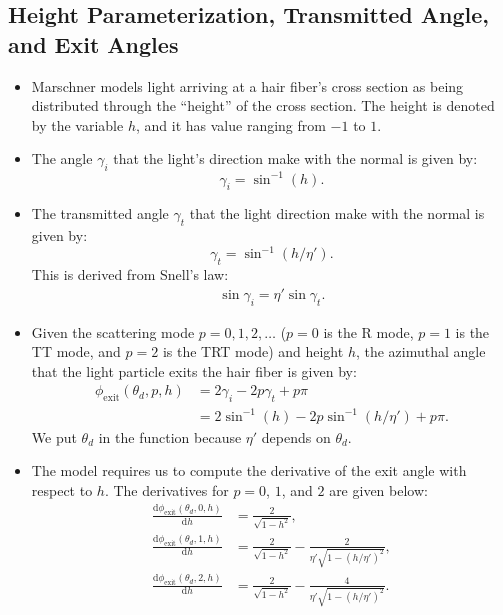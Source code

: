 \documentclass[10pt]{article}
\newcommand{\dee}{\mathrm{d}}
\newcommand{\exit}{\mathrm{exit}}
\begin{document}
  \subsection{Height Parameterization, Transmitted Angle, 
    and Exit Angles}
    
  \begin{itemize}
    \item Marschner models light arriving at a hair fiber's cross
      section as being distributed through the ``height'' of the
      cross section. The height is denoted by the variable $h$,
      and it has value ranging from $-1$ to $1$.
      
    \item The angle $\gamma_i$ that the light's direction make
      with the normal is given by:
      $$\gamma_i = \sin^{-1}(h).$$
      
    \item The transmitted angle $\gamma_t$ that the light direction
      make with the normal is given by:
      $$\gamma_t = \sin^{-1}(h / \eta').$$
      This is derived from Snell's law:
      \begin{align*}
        \sin \gamma_i = \eta' \sin \gamma_t.
      \end{align*}
      
    \item Given the scattering mode $p = 0, 1, 2, \ldots$
      ($p = 0$ is the R mode, $p = 1$ is the TT mode,
      and $p = 2$ is the TRT mode) and height $h$, 
      the azimuthal angle that the light particle exits 
      the hair fiber is given by:
      \begin{align*}
        \phi_\exit(\theta_d, p, h) 
        &= 2\gamma_i - 2p\gamma_t + p\pi\\
        &= 2\sin^{-1}(h) - 2p\sin^{-1}(h/\eta') + p\pi.
      \end{align*}
      We put $\theta_d$ in the function because $\eta'$
      depends on $\theta_d$.
      
      \item The model requires us to compute the derivative
        of the exit angle with respect to $h$. The derivatives
        for $p = 0$, $1$, and $2$ are given below:
        \begin{align*}
          \frac{\dee \phi_\exit(\theta_d, 0,h)}{\dee h}
          &= \frac{2}{\sqrt{1-h^2}},\\
          \frac{\dee \phi_\exit(\theta_d, 1,h)}{\dee h}
          &= \frac{2}{\sqrt{1-h^2}} - \frac{2}{\eta' \sqrt{1-(h/\eta')^2}},\\
          \frac{\dee \phi_\exit(\theta_d, 2,h)}{\dee h}
          &= \frac{2}{\sqrt{1-h^2}} - \frac{4}{\eta' \sqrt{1-(h/\eta')^2}}.\\
        \end{align*}
  \end{itemize}
  
\end{document}
